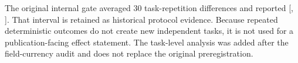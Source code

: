 The original internal gate averaged 30 task-repetition differences and
reported [\HistoricalCellCILower{}, \HistoricalCellCIUpper{}]. That interval
is retained as historical protocol evidence. Because repeated deterministic
outcomes do not create new independent tasks, it is not used for a
publication-facing effect statement. The task-level analysis was added after
the field-currency audit and does not replace the original preregistration.
